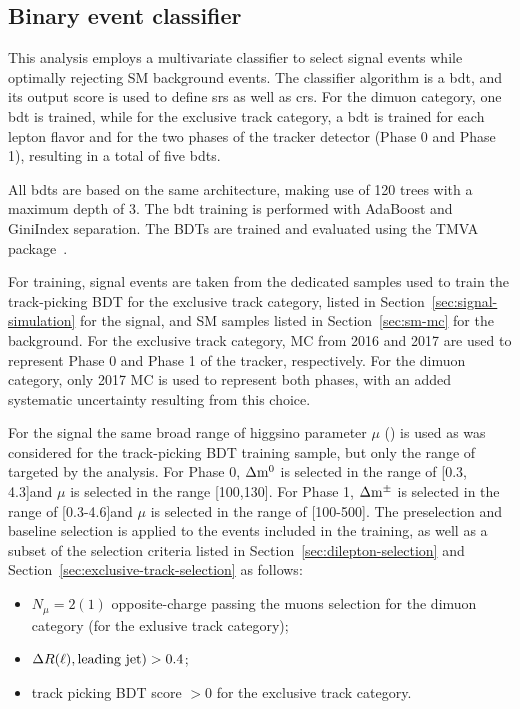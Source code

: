 \subsection{Binary event classifier}
\label{sec:event-bdt}

This analysis employs a multivariate classifier to select signal events while optimally rejecting SM background events. The classifier algorithm is a \gls{bdt}, and its output score is used to define \glspl{sr} as well as \glspl{cr}. For the dimuon category, one \gls{bdt} is trained, while for the exclusive track category, a \gls{bdt} is trained for each lepton flavor and for the two phases of the tracker detector (Phase 0 and Phase 1), resulting in a total of five \glspl{bdt}.

All \glspl{bdt} are based on the same architecture, making use of 120 trees with a maximum depth of 3. The \gls{bdt} training is performed with AdaBoost and GiniIndex separation. The BDTs are trained and evaluated using the TMVA package~\cite{tmva}. 

For training, signal events are taken from the dedicated samples used to train the track-picking BDT for the exclusive track category, listed in Section~\ref{sec:signal-simulation} for the signal, and SM samples listed in Section~\ref{sec:sm-mc} for the background. For the exclusive track category, MC from 2016 and 2017 are used to represent Phase 0 and Phase 1 of the tracker, respectively. For the dimuon category, only 2017 MC is used to represent both phases, with an added systematic uncertainty resulting from this choice.

For the signal the same broad range of higgsino parameter $\mu$ (\PSGcpmDo) is used as was considered for the track-picking BDT training sample, but only the range of \dm targeted by the analysis. For Phase 0, $\Delta\mathrm{m}^0$ is selected in the range of [0.3, 4.3]\GeV and $\mu$ is selected in the range [100,130]\GeV. For Phase 1, $\Delta\mathrm{m}^\pm$ is selected in the range of [0.3-4.6]\GeV and $\mu$ is selected in the range of [100-500]\GeV. The preselection and baseline selection is applied to the events included in the training, as well as a subset of the selection criteria listed in Section~\ref{sec:dilepton-selection} and Section~\ref{sec:exclusive-track-selection} as follows:

\begin{itemize}

\item $N_\mu = 2 (1)$ opposite-charge passing the muons selection for the dimuon category (for the exlusive track category);

\item $\Delta R(\ell),\text{leading jet}) > 0.4$;

\item track picking BDT score $ > 0$ for the exclusive track category.

\end{itemize}

